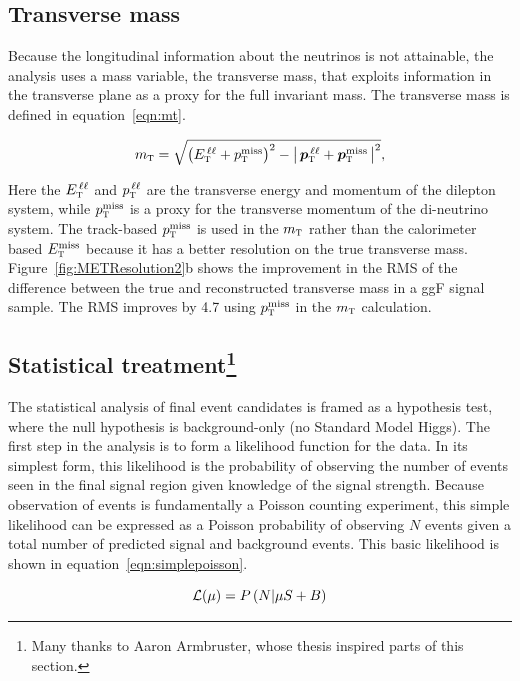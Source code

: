 \subsection{Transverse mass}
\label{sec:mt}
Because the longitudinal information about the neutrinos is not attainable, the \HWWfull analysis uses a mass variable, the transverse mass, that exploits information in the transverse plane as a proxy for the full invariant mass. The transverse mass is defined in equation~\ref{eqn:mt}.

\begin{equation}
  m_{\textrm{\footnotesize\sc t}} = \sqrt{\left(E_{\textrm{\footnotesize\sc t}}^{\,\ell\ell} + p_{\textrm{\footnotesize\sc t}}^{\rm miss}\right)^2 - \left|\,\hbox{\bm{$p$}}_{\textrm{\footnotesize\sc t}}^{\,\ell\ell} + \hbox{\bm{$p$}}_{\textrm{\footnotesize\sc t}}^{\rm miss}\,\right|^2},
\label{eqn:mt}
\end{equation}

Here the $E_{\textrm{\footnotesize\sc t}}^{\,\ell\ell}$ and $p_{\textrm{\footnotesize\sc t}}^{\,\ell\ell}$ are the transverse energy and momentum of the dilepton system, while $p_{\textrm{\footnotesize\sc t}}^{\rm miss}$ is a proxy for the transverse momentum of the di-neutrino system. The track-based $p_{\textrm{\footnotesize\sc t}}^{\rm miss}$ is used in the $m_{\textrm{\footnotesize\sc t}}$ rather than the calorimeter based $E_{\textrm{\footnotesize\sc t}}^{\rm miss}$ because it has a better resolution on the true transverse mass. Figure~\ref{fig:METResolution2}b shows the improvement in the RMS of the difference between the true and reconstructed transverse mass in a ggF signal sample. The RMS improves by 4.7 \GeV using $p_{\textrm{\footnotesize\sc t}}^{\rm miss}$ in the $m_{\textrm{\footnotesize\sc t}}$ calculation.

\subsection[title]{Statistical treatment\footnote{Many thanks to Aaron Armbruster, whose thesis\cite{ArmbrusterThesis} inspired parts of this section.}} 

The statistical analysis of final event candidates is framed as a hypothesis test, where the null hypothesis is background-only (no Standard Model Higgs). The first step in the analysis is to form a likelihood function for the data. In its simplest form, this likelihood is the probability of observing the number of events seen in the final signal region given knowledge of the signal strength. Because observation of events is fundamentally a Poisson counting experiment, this simple likelihood can be expressed as a Poisson probability of observing $N$ events given a total number of predicted signal and background events. This basic likelihood is shown in equation~\ref{eqn:simplepoisson}.

\begin{equation}
\mathcal{L}(\mu) = P\left(N | \mu S + B\right)
\label{eqn:simplepoisson}
\end{equation}

